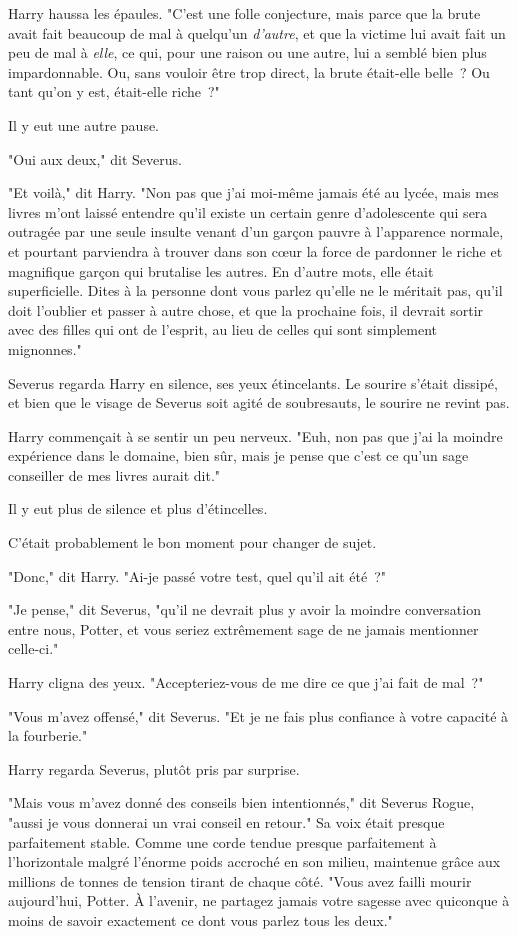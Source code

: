Harry haussa les épaules. "C'est une folle conjecture, mais parce que la brute avait fait beaucoup de mal à quelqu'un \emph{d'autre}, et que la victime lui avait fait un peu de mal à \emph{elle}, ce qui, pour une raison ou une autre, lui a semblé bien plus impardonnable. Ou, sans vouloir être trop direct, la brute était-elle belle~? Ou tant qu'on y est, était-elle riche~?"

Il y eut une autre pause.

"Oui aux deux," dit Severus.

"Et voilà," dit Harry. "Non pas que j'ai moi-même jamais été au lycée, mais mes livres m'ont laissé entendre qu'il existe un certain genre d'adolescente qui sera outragée par une seule insulte venant d'un garçon pauvre à l'apparence normale, et pourtant parviendra à trouver dans son cœur la force de pardonner le riche et magnifique garçon qui brutalise les autres. En d'autre mots, elle était superficielle. Dites à la personne dont vous parlez qu'elle ne le méritait pas, qu'il doit l'oublier et passer à autre chose, et que la prochaine fois, il devrait sortir avec des filles qui ont de l'esprit, au lieu de celles qui sont simplement mignonnes."

Severus regarda Harry en silence, ses yeux étincelants. Le sourire s'était dissipé, et bien que le visage de Severus soit agité de soubresauts, le sourire ne revint pas.

Harry commençait à se sentir un peu nerveux. "Euh, non pas que j'ai la moindre expérience dans le domaine, bien sûr, mais je pense que c'est ce qu'un sage conseiller de mes livres aurait dit."

Il y eut plus de silence et plus d'étincelles.

C'était probablement le bon moment pour changer de sujet.

"Donc," dit Harry. "Ai-je passé votre test, quel qu'il ait été~?"

"Je pense," dit Severus, "qu'il ne devrait plus y avoir la moindre conversation entre nous, Potter, et vous seriez extrêmement sage de ne jamais mentionner celle-ci."

Harry cligna des yeux. "Accepteriez-vous de me dire ce que j'ai fait de mal~?"

"Vous m'avez offensé," dit Severus. "Et je ne fais plus confiance à votre capacité à la fourberie."

Harry regarda Severus, plutôt pris par surprise.

"Mais vous m'avez donné des conseils bien intentionnés," dit Severus Rogue, "aussi je vous donnerai un vrai conseil en retour." Sa voix était presque parfaitement stable. Comme une corde tendue presque parfaitement à l'horizontale malgré l'énorme poids accroché en son milieu, maintenue grâce aux millions de tonnes de tension tirant de chaque côté. "Vous avez failli mourir aujourd'hui, Potter. À l'avenir, ne partagez jamais votre sagesse avec quiconque à moins de savoir exactement ce dont vous parlez tous les deux."

